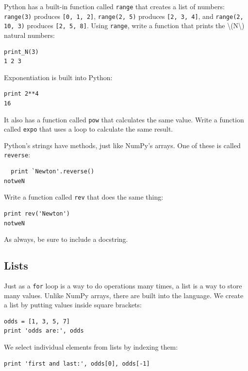 \documentclass{book}
\begin{document}
\begin{swcenumerate}
\item
  Python has a built-in function called \texttt{range} that creates a
  list of numbers: \texttt{range(3)} produces \texttt{{[}0, 1, 2{]}},
  \texttt{range(2, 5)} produces \texttt{{[}2, 3, 4{]}}, and
  \texttt{range(2, 10, 3)} produces \texttt{{[}2, 5, 8{]}}. Using
  \texttt{range}, write a function that prints the
  \textbackslash{}(N\textbackslash{}) natural numbers:
\begin{verbatim}
print_N(3)
1 2 3
\end{verbatim}
\item
  Exponentiation is built into Python:
\begin{verbatim}
print 2**4
16
\end{verbatim}
  It also has a function called
  \texttt{pow} that calculates the same value. Write a function called
  \texttt{expo} that uses a loop to calculate the same result.
\item
  Python's strings have methods, just like NumPy's arrays. One of these
  is called \texttt{reverse}:
\begin{verbatim}
  print `Newton'.reverse()
notweN
\end{verbatim}
  Write a function called \texttt{rev} that does the same thing:
\begin{verbatim}
print rev('Newton')
notweN
\end{verbatim}
  As always, be sure to include a
  docstring.
\end{swcenumerate}

\subsection{Lists}

Just as a \texttt{for} loop is a way to do operations many times, a list
is a way to store many values. Unlike NumPy arrays, there are built into
the language. We create a list by putting values inside square brackets:

\begin{verbatim}
odds = [1, 3, 5, 7]
print 'odds are:', odds
\end{verbatim}

We select individual elements from lists by indexing them:

\begin{verbatim}
print 'first and last:', odds[0], odds[-1]
\end{verbatim}
\end{document}
